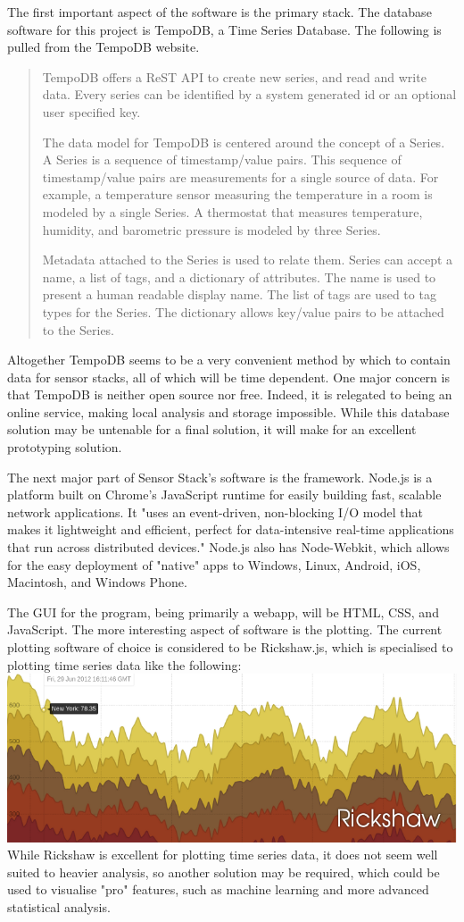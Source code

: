 		The first important aspect of the software is the primary stack.
		The database software for this project is TempoDB, a Time Series Database.
		The following is pulled from the TempoDB website.
		\begin{quote}
			TempoDB offers a ReST API to create new series, and read and write data. Every series can be identified by a system generated id or an optional user specified key. 
			
			The data model for TempoDB is centered around the concept of a Series. A Series is a sequence of timestamp/value pairs. This sequence of timestamp/value pairs are measurements for a single source of data. For example, a temperature sensor measuring the temperature in a room is modeled by a single Series. A thermostat that measures temperature, humidity, and barometric pressure is modeled by three Series.
			
			Metadata attached to the Series is used to relate them. Series can accept a name, a list of tags, and a dictionary of attributes. The name is used to present a human readable display name. The list of tags are used to tag types for the Series. The dictionary allows key/value pairs to be attached to the Series. 
		\end{quote}
		Altogether TempoDB seems to be a very convenient method by which to contain data for sensor stacks, all of which will be time dependent.
		One major concern is that TempoDB is neither open source nor free.
		Indeed, it is relegated to being an online service, making local analysis and storage impossible.
			While this database solution may be untenable for a final solution, it will make for an excellent prototyping solution.
			
		The next major part of Sensor Stack's software is the framework.
		Node.js is a platform built on Chrome's JavaScript runtime for easily building fast, scalable network applications. 
		It "uses an event-driven, non-blocking I/O model that makes it lightweight and efficient, perfect for data-intensive real-time applications that run across distributed devices."
		Node.js also has Node-Webkit, which allows for the easy deployment of "native" apps to Windows, Linux, Android, iOS, Macintosh, and Windows Phone.
			
		The GUI for the program, being primarily a webapp, will be HTML, CSS, and JavaScript.
		The more interesting aspect of software is the plotting.
		The current plotting software of choice is considered to be Rickshaw.js, which is specialised to plotting time series data like the following:
		\includegraphics[width=.5\textwidth]{gfx/rickshaw.png}
		While Rickshaw is excellent for plotting time series data, it does not seem well suited to heavier analysis, so another solution may be required, which could be used to visualise "pro" features, such as machine learning and more advanced statistical analysis.
		

